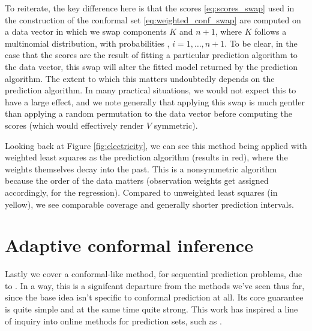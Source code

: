 \documentclass{article}
\begin{document}
To reiterate, the key difference here is that the scores \eqref{eq:scores_swap}
used in the construction of the conformal set \eqref{eq:weighted_conf_swap} are
computed on a data vector in which we swap components $K$ and $n+1$, where $K$
follows a multinomial distribution, with probabilities ,
$i=1,\dots,n+1$. To be clear, in the case that the scores are the result of
fitting a particular prediction algorithm to the data vector, this swap will
alter the fitted model returned by the prediction algorithm. The extent to which
this matters undoubtedly depends on the prediction algorithm. In many practical
situations, we would not expect this to have a large effect, and we note
generally that applying this swap is much gentler than applying a random
permutation to the data vector before computing the scores (which would
effectively render $V$ symmetric).

Looking back at Figure \ref{fig:electricity}, we can see this method being
applied with weighted least squares as the prediction algorithm (results in
red), where the weights themselves decay into the past. This is a nonsymmetric
algorithm because the order of the data matters (observation weights get
assigned accordingly, for  the regression). Compared to unweighted least squares
(in yellow), we see comparable coverage and generally shorter prediction
intervals. 

\section{Adaptive conformal inference}

\def\err{\mathrm{err}}

Lastly we cover a conformal-like method, for sequential prediction problems, due 
to \citet{gibbs2021adaptive}. In a way, this is a signifcant departure from the
methods we've seen thus far, since the base idea isn't specific to conformal
prediction at all. Its core guarantee is quite simple and at the same time quite
strong. This work has inspired a line of inquiry into online methods for
prediction sets, such as \citet{gibbs2022conformal, zaffran2022adaptive,
  bhatnagar2023improved, angelopoulos2023conformal}.
\end{document}
